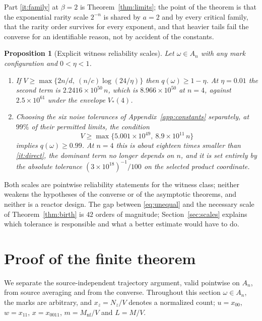\documentclass[11pt,letterpaper]{article}
\theoremstyle{plain}
\newtheorem{proposition}[theorem]{Proposition}
\theoremstyle{definition}
\theoremstyle{remark}
\numberwithin{equation}{section}
\newcommand{\nf}{\mathrm{nf}}
\newcommand{\floorstock}{(3\times10^{18})^{-1}}
\begin{document}
Part \ref{it:family} at $\beta=2$ is Theorem~\ref{thm:limits}; the point of the theorem is that the exponential rarity scale $2^{-n}$ is shared by $a=2$ and by every critical family, that the rarity order survives for every exponent, and that heavier tails fail the converse for an identifiable reason, not by accident of the constants.

\begin{proposition}[Explicit witness reliability scales]\label{prop:scales}
Let $\omega\in A_n$ with any mark configuration and $0<\eta<1$.
\begin{enumerate}[label=\textup{(\alph*)}]
\item\label{it:direct} If $V\ge\max\{2n/d,\ (n/c)\log(24/\eta)\}$ then $q(\omega)\ge1-\eta$. At $\eta=0.01$ the second term is $2.2416\times10^{50}\,n$, which is $8.966\times10^{50}$ at $n=4$, against $2.5\times10^{61}$ under the envelope $V_*(4)$.
\item\label{it:unequal} Choosing the six noise tolerances of Appendix~\ref{app:constants} separately, at $99\%$ of their permitted limits, the condition
\begin{equation}\label{eq:unequal}
 V\ge\max\bigl\{5.001\times10^{49},\ 8.9\times10^{11}\,n\bigr\}
\end{equation}
implies $q(\omega)\ge0.99$. At $n=4$ this is about eighteen times smaller than \ref{it:direct}, the dominant term no longer depends on $n$, and it is set entirely by the absolute tolerance $\floorstock/100$ on the selected product coordinate.
\end{enumerate}
\end{proposition}

Both scales are pointwise reliability statements for the witness class; neither weakens the hypotheses of the converse or of the asymptotic theorems, and neither is a reactor design. The gap between \eqref{eq:unequal} and the necessary scale of Theorem~\ref{thm:birth} is $42$ orders of magnitude; Section~\ref{sec:scales} explains which tolerance is responsible and what a better estimate would have to do.

\section{Proof of the finite theorem}\label{sec:proof}

We separate the source-independent trajectory argument, valid pointwise on $A_n$, from source averaging and from the converse. Throughout this section $\omega\in A_n$, the marks are arbitrary, and $x_z=N_z/V$ denotes a normalized count; $u=x_{00}$, $w=x_{11}$, $x=x_{0011}$, $m=M_\nf/V$ and $L=M/V$.
\end{document}
